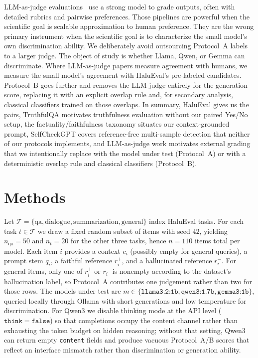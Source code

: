 \documentclass[11pt]{article}
\begin{document}
LLM-as-judge evaluations~\cite{llm-as-judge} use a strong model to grade outputs,
often with detailed rubrics and pairwise preferences. Those pipelines are
powerful when the scientific goal is scalable approximation to human preference.
They are the wrong primary instrument when the scientific goal is to characterize
the small model's own discrimination ability. We deliberately avoid outsourcing
Protocol~A labels to a larger judge. The object of study is whether Llama, Qwen,
or Gemma can discriminate. Where LLM-as-judge papers measure agreement with
humans, we measure the small model's agreement with HaluEval's pre-labeled
candidates. Protocol~B goes further and removes the LLM judge entirely for the
generation score, replacing it with an explicit overlap rule and, for secondary
analysis, classical classifiers trained on those overlaps. In summary, HaluEval
gives us the pairs, TruthfulQA motivates truthfulness evaluation without our
paired Yes/No setup, the factuality/faithfulness taxonomy situates our
context-grounded prompt, SelfCheckGPT covers reference-free multi-sample
detection that neither of our protocols implements, and LLM-as-judge work
motivates external grading that we intentionally replace with the model under
test (Protocol~A) or with a deterministic overlap rule and classical classifiers
(Protocol~B).

\section{Methods}

Let $\mathcal{T}=\{\mathrm{qa},\mathrm{dialogue},\mathrm{summarization},\mathrm{general}\}$
index HaluEval tasks. For each task $t\in\mathcal{T}$ we draw a fixed random
subset of items with seed $42$, yielding $n_{\mathrm{qa}}=50$ and $n_t=20$ for
the other three tasks, hence $n=110$ items total per model. Each item $i$
provides a context $c_i$ (possibly empty for general queries), a prompt stem
$q_i$, a faithful reference $r_i^+$, and a hallucinated reference $r_i^-$. For
general items, only one of $r_i^+$ or $r_i^-$ is nonempty according to the
dataset's hallucination label, so Protocol~A contributes one judgement rather
than two for those rows. The models under test are
$m\in\{\texttt{llama3.2:1b},\texttt{qwen3:1.7b},\texttt{gemma3:1b}\}$, queried
locally through Ollama with short generations and low temperature for
discrimination. For Qwen3 we disable thinking mode at the API level
($\mathtt{think{=}false}$) so that completions occupy the content channel rather
than exhausting the token budget on hidden reasoning; without that setting,
Qwen3 can return empty \texttt{content} fields and produce vacuous Protocol~A/B
scores that reflect an interface mismatch rather than discrimination or
generation ability.
\end{document}
